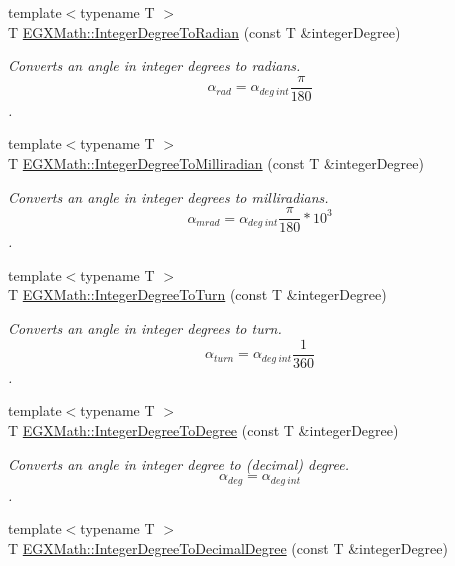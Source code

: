 \begin{DoxyCompactItemize}
\item 
{\footnotesize template$<$typename T $>$ }\\T \mbox{\hyperlink{group___e_g_x_math-_conversions-_angle_conversions-_integer_degree_ga05d3368b00ea27b9895de2ffe5c8df38}{E\+G\+X\+Math\+::\+Integer\+Degree\+To\+Radian}} (const T \&integer\+Degree)
\begin{DoxyCompactList}\small\item\em Converts an angle in integer degrees to radians. \[\alpha_{rad}=\alpha_{deg\ int}\frac{\pi}{180}\]. \end{DoxyCompactList}\item 
{\footnotesize template$<$typename T $>$ }\\T \mbox{\hyperlink{group___e_g_x_math-_conversions-_angle_conversions-_integer_degree_ga5379a68bdff5cc4fab5bb1ba06ef9453}{E\+G\+X\+Math\+::\+Integer\+Degree\+To\+Milliradian}} (const T \&integer\+Degree)
\begin{DoxyCompactList}\small\item\em Converts an angle in integer degrees to milliradians. \[\alpha_{mrad}=\alpha_{deg\ int}\frac{\pi}{180}*10^3\]. \end{DoxyCompactList}\item 
{\footnotesize template$<$typename T $>$ }\\T \mbox{\hyperlink{group___e_g_x_math-_conversions-_angle_conversions-_integer_degree_ga06ddbdada5a3978105c855d4aae735ae}{E\+G\+X\+Math\+::\+Integer\+Degree\+To\+Turn}} (const T \&integer\+Degree)
\begin{DoxyCompactList}\small\item\em Converts an angle in integer degrees to turn. \[\alpha_{turn}=\alpha_{deg\ int}\frac{1}{360}\]. \end{DoxyCompactList}\item 
{\footnotesize template$<$typename T $>$ }\\T \mbox{\hyperlink{group___e_g_x_math-_conversions-_angle_conversions-_integer_degree_gaa9b63c6095fd7f8809fcfa2ba1e62235}{E\+G\+X\+Math\+::\+Integer\+Degree\+To\+Degree}} (const T \&integer\+Degree)
\begin{DoxyCompactList}\small\item\em Converts an angle in integer degree to (decimal) degree. \[\alpha_{deg}=\alpha_{deg\ int}\]. \end{DoxyCompactList}\item 
{\footnotesize template$<$typename T $>$ }\\T \mbox{\hyperlink{group___e_g_x_math-_conversions-_angle_conversions-_integer_degree_gac219c3198508ba984d8d81d22831b27d}{E\+G\+X\+Math\+::\+Integer\+Degree\+To\+Decimal\+Degree}} (const T \&integer\+Degree)

\end{DoxyCompactItemize}
